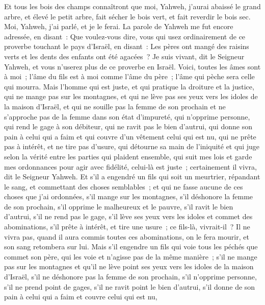 \begin{multicols}{2}
Et tous les bois des champs connaîtront que moi, Yahweh, j'aurai abaissé le grand arbre, et élevé le petit arbre, fait sécher le bois vert, et fait reverdir le bois sec. Moi, Yahweh, j'ai parlé, et je le ferai.
\VerseOne{}La parole de Yahweh me fut encore adressée, en disant~:
Que voulez-vous dire, vous qui usez ordinairement de ce proverbe touchant le pays d'Israël, en disant~: Les pères ont mangé des raisins verts et les dents des enfants ont été agacées~?
Je suis vivant, dit le Seigneur Yahweh, et vous n'userez plus de ce proverbe en Israël.
Voici, toutes les âmes sont à moi~; l'âme du fils est à moi comme l'âme du père~; l'âme qui pèche sera celle qui mourra.
Mais l'homme qui est juste, et qui pratique la droiture et la justice,
qui ne mange pas sur les montagnes, et qui ne lève pas ses yeux vers les idoles de la maison d'Israël, et qui ne souille pas la femme de son prochain et ne s'approche pas de la femme dans son état d'impureté,
qui n'opprime personne, qui rend le gage à son débiteur, qui ne ravit pas le bien d'autrui, qui donne son pain à celui qui a faim et qui couvre d'un vêtement celui qui est nu,
qui ne prête pas à intérêt, et ne tire pas d'usure, qui détourne sa main de l'iniquité et qui juge selon la vérité entre les parties qui plaident ensemble,
qui suit mes lois et garde mes ordonnances pour agir avec fidélité, celui-là est juste~; certainement il vivra, dit le Seigneur Yahweh.
Et s'il a engendré un fils qui soit un meurtrier, répandant le sang, et commettant des choses semblables~;
et qui ne fasse aucune de ces choses que j'ai ordonnées, s'il mange sur les montagnes, s'il déshonore la femme de son prochain,
s'il opprime le malheureux et le pauvre, s'il ravit le bien d'autrui, s'il ne rend pas le gage, s'il lève ses yeux vers les idoles et commet des abominations,
s'il prête à intérêt, et tire une usure~; ce fils-là, vivrait-il~? Il ne vivra pas, quand il aura commis toutes ces abominations, on le fera mourir, et son sang retombera sur lui.
Mais s'il engendre un fils qui voie tous les péchés que commet son père, qui les voie et n'agisse pas de la même manière~;
s'il ne mange pas sur les montagnes et qu'il ne lève point ses yeux vers les idoles de la maison d'Israël, s'il ne déshonore pas la femme de son prochain,
s'il n'opprime personne, s'il ne prend point de gages, s'il ne ravit point le bien d'autrui, s'il donne de son pain à celui qui a faim et couvre celui qui est nu,

\end{multicols}

